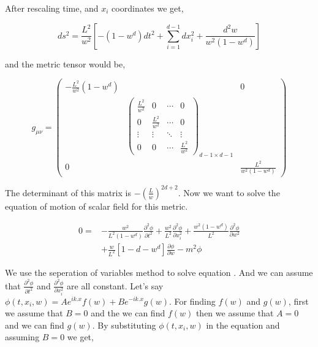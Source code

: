 After rescaling time, and $x_i$ coordinates we get,

\begin{equation}
    ds^2 = \frac{L^2}{w^2} \left[ -(1-w^d) dt^2 + \sum\limits_{i=1}^{d-1} dx_i^2 + \frac{d^2w}{w^2 (1-w^d)} \right]
\end{equation}

and the metric tensor would be,

\begin{equation}\label{eq:nAdSmetrictensor}
    g_{\mu\nu} = 
    \begin{pmatrix}
        -\frac{L^2}{w^2}(1-w^d) & & 0 \\
        & \begin{pmatrix}
            \frac{L^2}{w^2} & 0 & \cdots & 0 \\
            0 & \frac{L^2}{w^2} & \cdots & 0 \\
            \vdots  & \vdots  & \ddots & \vdots  \\
            0 & 0 & \cdots & \frac{L^2}{w^2}
        \end{pmatrix}_{d-1 \times d-1}
        &\\
        0 & & \frac{L^2}{w^2(1-w^d)} 
    \end{pmatrix}
\end{equation}

The determinant of this matrix is $-(\frac{L}{w})^{2d+2}$. Now we want to solve the equation of motion of scalar field for this metric.

\begin{align} \label{eq:BlackHoleAdSMotionEquationw}
   0 =& - \frac{w^2}{L^2(1-w^d)}\frac{\partial^2 \phi}{\partial t^2} + \frac{w^2}{L^2}\frac{\partial^2 \phi}{\partial x_i^2} + \frac{w^2 (1-w^d)}{L^2}\frac{\partial^2 \phi}{\partial w^2} \nonumber\\
   & + \frac{w}{L^2} \left[ 1-d -w^d  \right] \frac{\partial \phi}{\partial w} - m^2 \phi
\end{align}

We use the seperation of variables method to solve equation \label{eq:BlackHoleAdSMotionEquationw}. And we can assume that $\frac{\partial^2 \phi}{\partial t^2}$ and $\frac{\partial^2 \phi}{\partial x_i^2}$ are all constant. Let's say $\phi(t,x_i,w) = Ae^{ik.x}f(w) + Be^{-ik.x}g(w)$. For finding $f(w)$ and $g(w)$, first we assume that $B=0$ and the we can find $f(w)$ then we assume that $A=0$ and we can find $g(w)$. By substituting $\phi(t,x_i,w)$ in the equation and assuming $B=0$ we get,

